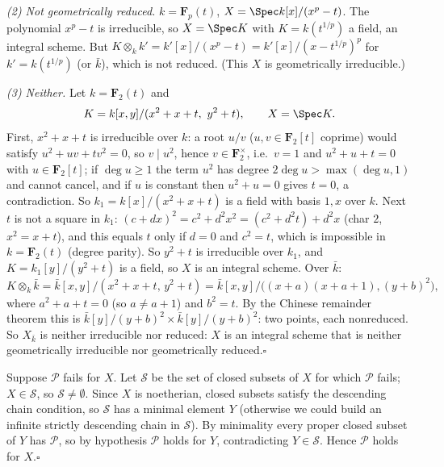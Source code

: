 \documentclass[11pt]{article}
\begin{document}
\emph{(2) Not geometrically reduced.} $k=\mathbf F_p(t)$, $X=\Spec k[x]/(x^p-t)$. The polynomial $x^p-t$ is irreducible, so $X=\Spec K$ with $K=k(t^{1/p})$ a field, an integral scheme. But $K\otimes_kk'=k'[x]/(x^p-t)=k'[x]/(x-t^{1/p})^p$ for $k'=k(t^{1/p})$ (or $\bar k$), which is not reduced. (This $X$ is geometrically irreducible.)

\emph{(3) Neither.} Let $k=\mathbf F_2(t)$ and
\[K=k[x,y]/(x^2+x+t,\ y^2+t),\qquad X=\Spec K.\]
First, $x^2+x+t$ is irreducible over $k$: a root $u/v$ ($u,v\in\mathbf F_2[t]$ coprime) would satisfy $u^2+uv+tv^2=0$, so $v\mid u^2$, hence $v\in\mathbf F_2^\times$, i.e.\ $v=1$ and $u^2+u+t=0$ with $u\in\mathbf F_2[t]$; if $\deg u\ge1$ the term $u^2$ has degree $2\deg u>\max(\deg u,1)$ and cannot cancel, and if $u$ is constant then $u^2+u=0$ gives $t=0$, a contradiction. So $k_1=k[x]/(x^2+x+t)$ is a field with basis $1,x$ over $k$. Next $t$ is not a square in $k_1$: $(c+dx)^2=c^2+d^2x^2=(c^2+d^2t)+d^2x$ (char $2$, $x^2=x+t$), and this equals $t$ only if $d=0$ and $c^2=t$, which is impossible in $k=\mathbf F_2(t)$ (degree parity). So $y^2+t$ is irreducible over $k_1$, and $K=k_1[y]/(y^2+t)$ is a field, so $X$ is an integral scheme. Over $\bar k$:
\[K\otimes_k\bar k=\bar k[x,y]/(x^2+x+t,\,y^2+t)=\bar k[x,y]/\big((x+a)(x+a+1),(y+b)^2\big),\]
where $a^2+a+t=0$ (so $a\ne a+1$) and $b^2=t$. By the Chinese remainder theorem this is $\bar k[y]/(y+b)^2\times\bar k[y]/(y+b)^2$: two points, each nonreduced. So $X_{\bar k}$ is neither irreducible nor reduced: $X$ is an integral scheme that is neither geometrically irreducible nor geometrically reduced.\hfill$\square$

\pf
Suppose $\mathcal P$ fails for $X$. Let $\mathcal S$ be the set of closed subsets of $X$ for which $\mathcal P$ fails; $X\in\mathcal S$, so $\mathcal S\ne\emptyset$. Since $X$ is noetherian, closed subsets satisfy the descending chain condition, so $\mathcal S$ has a minimal element $Y$ (otherwise we could build an infinite strictly descending chain in $\mathcal S$). By minimality every proper closed subset of $Y$ has $\mathcal P$, so by hypothesis $\mathcal P$ holds for $Y$, contradicting $Y\in\mathcal S$. Hence $\mathcal P$ holds for $X$.\hfill$\square$
\end{document}
